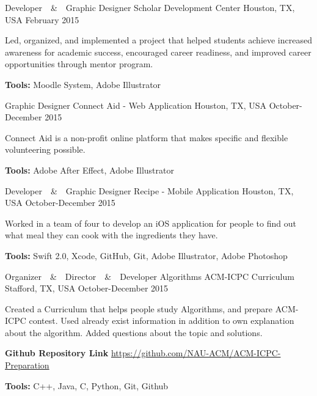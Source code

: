 \begin{cventries}
  \cventry
  	{Developer~~\&~~Graphic Designer}
    {Scholar Development Center}
    {Houston, TX, USA}
    {February 2015}
    {
      \begin{cvitems}
        \item {Led, organized, and implemented a project that helped students achieve increased awareness for academic success, encouraged career readiness, and improved career opportunities through mentor program.}
        \item {\textbf{Tools:} Moodle System, Adobe Illustrator}
      \end{cvitems}
    }
    \cventry
  	{Graphic Designer}
    {Connect Aid - \tiny{Web Application}}
    {Houston, TX, USA}
    {October-December 2015}
    {
      \begin{cvitems}
        \item {Connect Aid is a non-profit online platform that makes specific and flexible volunteering possible.}
        \item {\textbf{Tools:} Adobe After Effect, Adobe Illustrator}
      \end{cvitems}
    }
    \cventry
  	{Developer~~\&~~Graphic Designer}
    {Recipe - \tiny{Mobile Application}}
    {Houston, TX, USA}
    {October-December 2015}
    {
      \begin{cvitems}
        \item {Worked in a team of four to develop an iOS application for people to find out what meal they can cook with the ingredients they have.}
        \item {\textbf{Tools:} Swift 2.0, Xcode, GitHub, Git, Adobe Illustrator, Adobe Photoshop}
      \end{cvitems}
    }
    \cventry
  	{Organizer~~\&~~Director~~\&~~Developer}
    {Algorithms ACM-ICPC Curriculum}
    {Stafford, TX, USA}
    {October-December 2015}
    {
      \begin{cvitems}
        \item {Created a Curriculum that helps people study Algorithms, and prepare ACM-ICPC contest. Used already exist
information in addition to own explanation about the algorithm. Added questions about the topic and solutions.}
		\item{\textbf{Github Repository Link}  \href{https://github.com/NAU-ACM/ACM-ICPC-Preparation}{https://github.com/NAU-ACM/ACM-ICPC-Preparation}}
        \item {\textbf{Tools:} C++, Java, C, Python, Git, Github}

\end{cvitems}}
\end{cventries}
